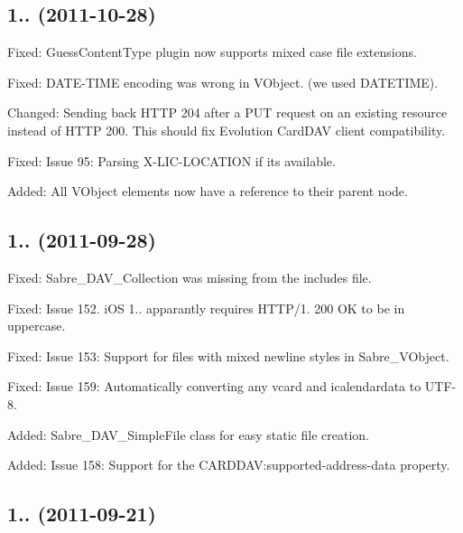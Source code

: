 \subsection*{1.. (2011-\/10-\/28) }


\begin{DoxyItemize}
\item Fixed\+: Guess\+Content\+Type plugin now supports mixed case file extensions.
\item Fixed\+: D\+A\+T\+E-\/\+T\+I\+ME encoding was wrong in V\+Object. (we used \textquotesingle{}D\+A\+T\+E\+T\+I\+ME\textquotesingle{}).
\item Changed\+: Sending back H\+T\+TP 204 after a P\+UT request on an existing resource instead of H\+T\+TP 200. This should fix Evolution Card\+D\+AV client compatibility.
\item Fixed\+: Issue 95\+: Parsing X-\/\+L\+I\+C-\/\+L\+O\+C\+A\+T\+I\+ON if it\textquotesingle{}s available.
\item Added\+: All V\+Object elements now have a reference to their parent node.
\end{DoxyItemize}

\subsection*{1.. (2011-\/09-\/28) }


\begin{DoxyItemize}
\item Fixed\+: Sabre\+\_\+\+D\+A\+V\+\_\+\+Collection was missing from the includes file.
\item Fixed\+: Issue 152. i\+OS 1.. apparantly requires H\+T\+T\+P/1. 200 OK to be in uppercase.
\item Fixed\+: Issue 153\+: Support for files with mixed newline styles in Sabre\+\_\+\+V\+Object.
\item Fixed\+: Issue 159\+: Automatically converting any vcard and icalendardata to U\+T\+F-\/8.
\item Added\+: Sabre\+\_\+\+D\+A\+V\+\_\+\+Simple\+File class for easy static file creation.
\item Added\+: Issue 158\+: Support for the C\+A\+R\+D\+D\+AV\+:supported-\/address-\/data property.
\end{DoxyItemize}

\subsection*{1.. (2011-\/09-\/21) }


